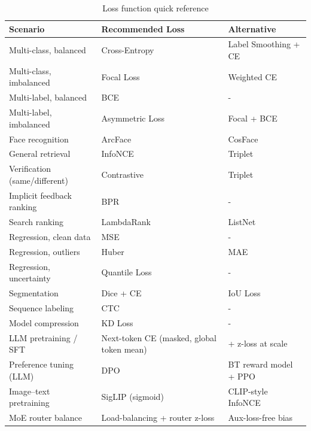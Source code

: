 \begin{table}[H]
\centering
\caption{Loss function quick reference}
\begin{tabularx}{\textwidth}{lXl}
\toprule
\textbf{Scenario} & \textbf{Recommended Loss} & \textbf{Alternative} \\
\midrule
Multi-class, balanced & Cross-Entropy & Label Smoothing + CE \\
Multi-class, imbalanced & Focal Loss & Weighted CE \\
Multi-label, balanced & BCE & - \\
Multi-label, imbalanced & Asymmetric Loss & Focal + BCE \\
Face recognition & ArcFace & CosFace \\
General retrieval & InfoNCE & Triplet \\
Verification (same/different) & Contrastive & Triplet \\
Implicit feedback ranking & BPR & - \\
Search ranking & LambdaRank & ListNet \\
Regression, clean data & MSE & - \\
Regression, outliers & Huber & MAE \\
Regression, uncertainty & Quantile Loss & - \\
Segmentation & Dice + CE & IoU Loss \\
Sequence labeling & CTC & - \\
Model compression & KD Loss & - \\
LLM pretraining / SFT & Next-token CE (masked, global token mean) & + z-loss at scale \\
Preference tuning (LLM) & DPO & BT reward model + PPO \\
Image--text pretraining & SigLIP (sigmoid) & CLIP-style InfoNCE \\
MoE router balance & Load-balancing + router z-loss & Aux-loss-free bias \\
\bottomrule
\end{tabularx}
\end{table}

